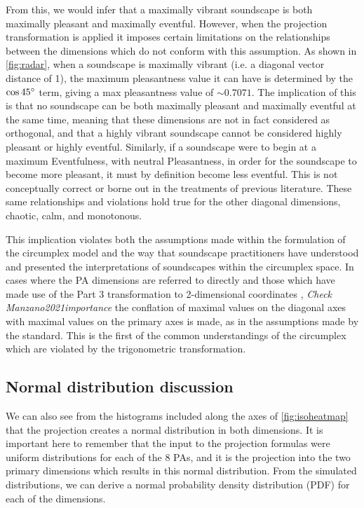 From this, we would infer that a maximally vibrant soundscape is both maximally pleasant and maximally eventful. However, when the projection transformation is applied it imposes certain limitations on the relationships between the dimensions which do not conform with this assumption. As shown in \autoref{fig:radar}, when a soundscape is maximally vibrant (i.e. a diagonal vector distance of 1), the maximum pleasantness value it can have is determined by the $\cos 45\degree$ term, giving a max pleasantness value of $\sim0.7071$. The implication of this is that no soundscape can be both maximally pleasant and maximally eventful at the same time, meaning that these dimensions are not in fact considered as orthogonal, and that a highly vibrant soundscape cannot be considered highly pleasant or highly eventful. Similarly, if a soundscape were to begin at a maximum Eventfulness, with neutral Pleasantness, in order for the soundscape to become more pleasant, it must by definition become less eventful. This is not conceptually correct or borne out in the treatments of previous literature. These same relationships and violations hold true for the other diagonal dimensions, chaotic, calm, and monotonous.

This implication violates both the assumptions made within the formulation of the circumplex model and the way that soundscape practitioners have understood and presented the interpretations of soundscapes within the circumplex space. In cases where the PA dimensions are referred to directly \citep{steele2016evaluation, steele2019soundtracking} and those which have made use of the Part 3 transformation to 2-dimensional coordinates \citep{Mancini2021Soundwalk, Lionello2021Introducing, Manzano2021importance}, \emph{Check Manzano2021importance} the conflation of maximal values on the diagonal axes with maximal values on the primary axes is made, as in the assumptions made by the standard. This is the first of the common understandings of the circumplex which are violated by the trigonometric transformation.

\subsection{Normal distribution discussion}

We can also see from the histograms included along the axes of \autoref{fig:isoheatmap} that the projection creates a normal distribution in both dimensions. %
It is important here to remember that the input to the projection formulas were uniform distributions for each of the 8 PAs, and it is the projection into the two primary dimensions which results in this normal distribution.
From the simulated distributions, we can derive a normal probability density distribution (PDF) for each of the dimensions.

